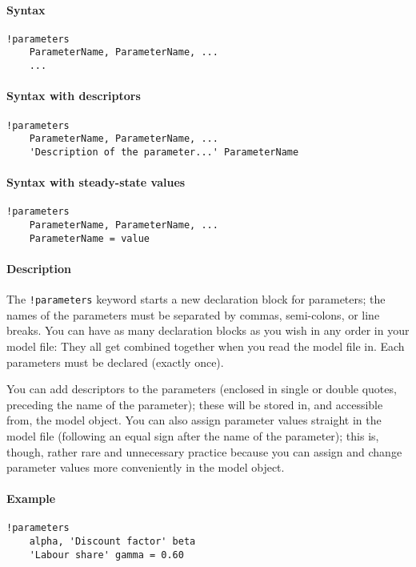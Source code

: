 


	\paragraph{Syntax}

\begin{verbatim}
!parameters
    ParameterName, ParameterName, ...
    ...
\end{verbatim}

\paragraph{Syntax with descriptors}

\begin{verbatim}
!parameters
    ParameterName, ParameterName, ...
    'Description of the parameter...' ParameterName
\end{verbatim}

\paragraph{Syntax with steady-state
values}

\begin{verbatim}
!parameters
    ParameterName, ParameterName, ...
    ParameterName = value
\end{verbatim}

\paragraph{Description}

The \texttt{!parameters} keyword starts a new declaration block for
parameters; the names of the parameters must be separated by commas,
semi-colons, or line breaks. You can have as many declaration blocks as
you wish in any order in your model file: They all get combined together
when you read the model file in. Each parameters must be declared
(exactly once).

You can add descriptors to the parameters (enclosed in single or double
quotes, preceding the name of the parameter); these will be stored in,
and accessible from, the model object. You can also assign parameter
values straight in the model file (following an equal sign after the
name of the parameter); this is, though, rather rare and unnecessary
practice because you can assign and change parameter values more
conveniently in the model object.

\paragraph{Example}

\begin{verbatim}
!parameters
    alpha, 'Discount factor' beta
    'Labour share' gamma = 0.60
\end{verbatim}



